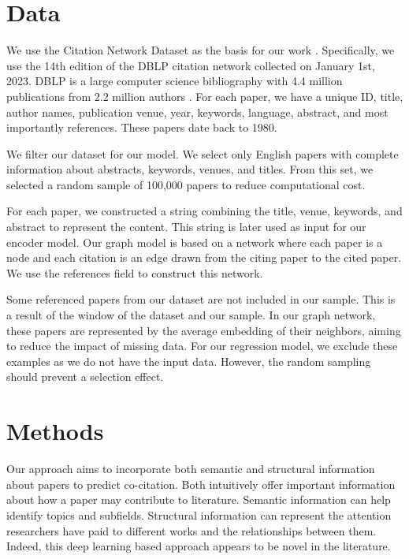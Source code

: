 \documentclass[10pt,twocolumn,letterpaper]{article}
\begin{document}
\section{Data}

We use the Citation Network Dataset as the basis for our work \cite{tang2008arnetminer}. Specifically, we use the 14th edition of the DBLP citation network collected on January 1st, 2023. DBLP is a large computer science bibliography with 4.4 million publications from 2.2 million authors \cite{ley2002dblp}. 
For each paper, we have a unique ID, title, author names, publication venue, year, keywords, language, abstract, and most importantly references. These papers date back to 1980.

We filter our dataset for our model. We select only English papers with complete information about abstracts, keywords, venues, and titles. From this set, we selected a random sample of 100,000 papers to reduce computational cost.

For each paper, we constructed a string combining the title, venue, keywords, and abstract to represent the content. This string is later used as input for our encoder model. Our graph model is based on a network where each paper is a node and each citation is an edge drawn from the citing paper to the cited paper. We use the references field to construct this network. 

Some referenced papers from our dataset are not included in our sample. This is a result of the window of the dataset and our sample.
In our graph network, these papers are represented by the average embedding of their neighbors, aiming to reduce the impact of missing data. 
For our regression model, we exclude these examples as we do not have the input data.
However, the random sampling should prevent a selection effect.

\section{Methods}


Our approach aims to incorporate both semantic and structural information about papers to predict co-citation. Both intuitively offer important information about how a paper may contribute to literature. Semantic information can help identify topics and subfields. Structural information can represent the attention researchers have paid to different works and the relationships between them. Indeed, this deep learning based approach appears to be novel in the literature. 
\end{document}
